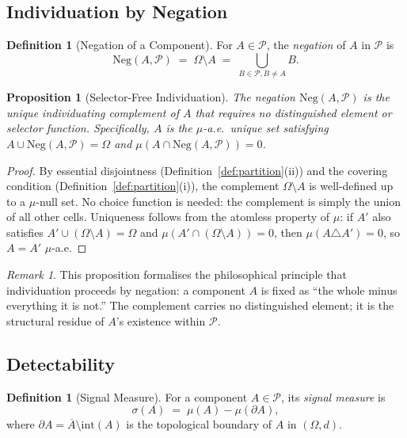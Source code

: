 \documentclass[12pt,a4paper,twocolumn]{article}
\theoremstyle{plain}
\newtheorem{proposition}[theorem]{Proposition}
\theoremstyle{definition}
\newtheorem{definition}[theorem]{Definition}
\theoremstyle{remark}
\newtheorem{remark}[theorem]{Remark}
\newcommand{\Part}{\mathcal{P}}
\newcommand{\Neg}{\mathrm{Neg}}
\begin{document}
\subsection{Individuation by Negation}

\begin{definition}[Negation of a Component]
\label{def:negation}
For $A \in \Part$, the \emph{negation} of $A$ in $\Part$ is
\begin{equation}
  \Neg(A, \Part) \;=\; \Omega \setminus A \;=\; \bigcup_{B \in \Part, B \neq A} B.
\end{equation}
\end{definition}

\begin{proposition}[Selector-Free Individuation]
\label{prop:selector-free}
The negation $\Neg(A,\Part)$ is the unique individuating complement of $A$
that requires no distinguished element or selector function.  Specifically,
$A$ is the $\mu$-a.e.\ unique set satisfying $A \cup \Neg(A,\Part) = \Omega$
and $\mu(A \cap \Neg(A,\Part)) = 0$.
\end{proposition}

\begin{proof}
By essential disjointness (Definition~\ref{def:partition}(ii)) and the
covering condition (Definition~\ref{def:partition}(i)), the complement
$\Omega \setminus A$ is well-defined up to a $\mu$-null set.  No choice
function is needed: the complement is simply the union of all other cells.
Uniqueness follows from the atomless property of $\mu$: if $A'$ also satisfies
$A' \cup (\Omega \setminus A) = \Omega$ and $\mu(A' \cap (\Omega \setminus
A)) = 0$, then $\mu(A \triangle A') = 0$, so $A = A'$ $\mu$-a.e.
\end{proof}

\begin{remark}
This proposition formalises the philosophical principle that individuation
proceeds by negation: a component $A$ is fixed as ``the whole minus everything
it is not.''  The complement carries no distinguished element; it is the
structural residue of $A$'s existence within $\Part$.
\end{remark}

\subsection{Detectability}

\begin{definition}[Signal Measure]
\label{def:signal}
For a component $A \in \Part$, its \emph{signal measure} is
\begin{equation}
  \sigma(A) \;=\; \mu(A) - \mu(\partial A),
\end{equation}
where $\partial A = \overline{A} \setminus \mathrm{int}(A)$ is the topological
boundary of $A$ in $(\Omega, d)$.
\end{definition}
\end{document}
